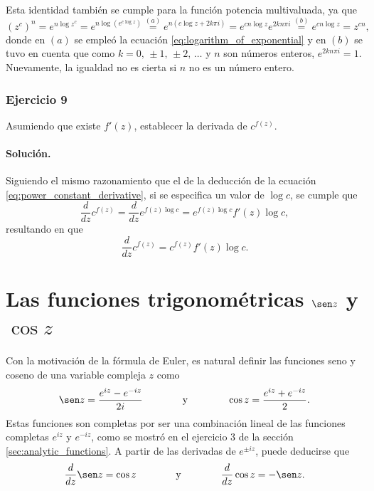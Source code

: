 \documentclass[a4paper]{report}
\begin{document}
\begin{enumerate}
 Esta identidad también se cumple para la función potencia multivaluada, ya que 
 \[
  (z^c)^n=e^{n\log z^c}=e^{n\log(e^{c\log z})}\overset{(a)}{=}e^{n(c\log z+2k\pi i)}
  =e^{cn\log z}e^{2kn\pi i}\overset{(b)}{=}e^{cn\log z}=z^{cn},
 \]
 donde en \((a)\) se empleó la ecuación  \ref{eq:logarithm_of_exponential} y en \((b)\) se tuvo en cuenta que como \(k=0,\,\pm1,\,\pm2,\,\dots\) y \(n\) son números enteros, \(e^{2kn\pi i}=1\). Nuevamente, la igualdad no es cierta si \(n\) no es un número entero.
\end{enumerate}
 
\subsubsection{Ejercicio 9}

Asumiendo que existe \(f'(z)\), establecer la derivada de \(c^{f(z)}\). 

\paragraph{Solución.} Siguiendo el mismo razonamiento que el de la deducción de la ecuación \ref{eq:power_constant_derivative}, si se especifica un valor de \(\log c\), se cumple que 
\[
 \frac{d}{dz}c^{f(z)}=\frac{d}{dz}e^{f(z)\log c}=e^{f(z)\log c}f'(z)\log c,
\]
resultando en que 
\[
 \frac{d}{dz}c^{f(z)}=c^{f(z)}f'(z)\log c.
\]

\section{Las funciones trigonométricas \texorpdfstring{\(\sen z\)}{sen z} y \texorpdfstring{\(\cos z\)}{cos z}}\label{sec:trigonometric_functions_sin_and_cos}

Con la motivación de la fórmula de Euler, es natural definir las funciones seno y coseno de una variable compleja \(z\) como
\begin{equation}\label{eq:sin_and_cosine_definition}
 \sen z=\frac{e^{iz}-e^{-iz}}{2i}
 \qquad\qquad\textrm{y}\qquad\qquad 
 \cos z=\frac{e^{iz}+e^{-iz}}{2}. 
\end{equation}
Estas funciones son completas por ser una combinación lineal de las funciones completas \(e^{iz}\) y \(e^{-iz}\), como se mostró en el ejercicio 3 de la sección \ref{sec:analytic_functions}. A partir de las derivadas de \(e^{\pm iz}\), puede deducirse que
\begin{equation}\label{eq:sin_and_cosine_derivatives}
 \frac{d}{dz}\sen z=\cos z
 \qquad\qquad\textrm{y}\qquad\qquad 
 \frac{d}{dz}\cos z=-\sen z. 
\end{equation}
\end{document}
